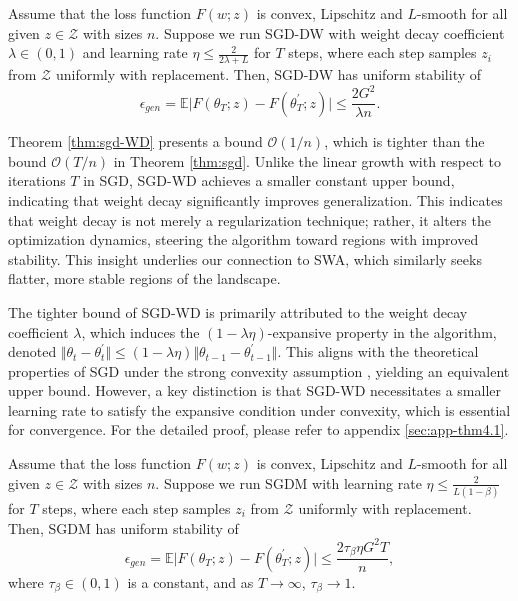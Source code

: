 \begin{theorem}\label{thm:sgd-WD}
Assume that the loss function $F(w;z)$ is convex, Lipschitz and $L$-smooth for all given $z\in\mathcal{Z}$ with sizes $n$. Suppose we run SGD-DW with weight decay coefficient $\lambda \in (0,1)$ and learning rate $\eta \leq \frac{2}{2\lambda +L}$ for $T$ steps, where each step samples $z_i$ from $\mathcal{Z}$ uniformly with replacement. Then, SGD-DW has uniform stability of 
\begin{equation}
  \epsilon_{gen} = \mathbb{E}\vert F(\theta_T;z)-F(\theta^{\prime}_T;z)\vert \leq \frac{2G^2}{\lambda n}.
 \end{equation}
\end{theorem}

\begin{remark}
Theorem \ref{thm:sgd-WD} presents a bound $\mathcal{O}(1/n)$, which is tighter than the bound $\mathcal{O}(T/n)$ in Theorem \ref{thm:sgd}. Unlike the linear growth with respect to iterations $T$ in SGD, SGD-WD achieves a smaller constant upper bound, indicating that weight decay significantly improves generalization. This indicates that weight decay is not merely a regularization technique; rather, it alters the optimization dynamics, steering the algorithm toward regions with improved stability. This insight underlies our connection to SWA, which similarly seeks flatter, more stable regions of the landscape. 
\end{remark}

\begin{remark}\label{remark 2}
The tighter bound of SGD-WD is primarily attributed to the weight decay coefficient $\lambda$, which induces the $(1-\lambda\eta)$-expansive property in the algorithm, denoted $\Vert \theta_t-\theta^{\prime}_t\Vert \leq (1-\lambda\eta)\Vert \theta_{t-1} - \theta^{\prime}_{t-1}\Vert$. This aligns with the theoretical properties of SGD under the strong convexity assumption \cite{hardt2016train}, yielding an equivalent upper bound. However, a key distinction is that SGD-WD necessitates a smaller learning rate to satisfy the expansive condition under convexity, which is essential for convergence. For the detailed proof, please refer to appendix \ref{sec:app-thm4.1}.    
\end{remark}

\begin{theorem}\label{thm:sgdm}
Assume that the loss function $F(w;z)$ is convex, Lipschitz and $L$-smooth for all given $z\in\mathcal{Z}$ with sizes $n$. Suppose we run SGDM with learning rate $\eta \leq \frac{2}{L(1-\beta)}$ for $T$ steps, where each step samples $z_i$ from $\mathcal{Z}$ uniformly with replacement. Then, SGDM has uniform stability of 
\begin{equation}
  \epsilon_{gen} = \mathbb{E}\vert F(\theta_T;z)-F(\theta^{\prime}_T;z)\vert \leq \frac{2\tau_{\beta}\eta G^2 T}{n},
 \end{equation}
where $\tau_{\beta}\in(0,1)$ is a constant, and as $T\rightarrow\infty$, $\tau_{\beta}\rightarrow 1$. 
\end{theorem}


